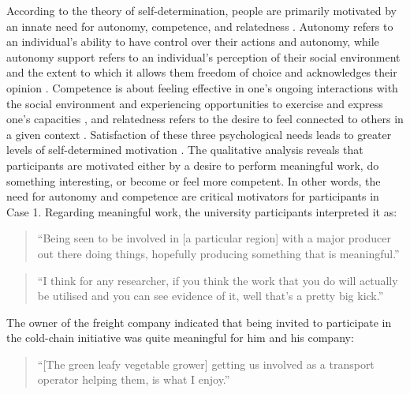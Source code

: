 According to the theory of self-determination, people are primarily motivated by an innate need for autonomy, competence, and relatedness \citep{deci1989self}. Autonomy refers to an individual's ability to have control over their actions and autonomy, while autonomy support refers to an individual's perception of their social environment and the extent to which it allows them freedom of choice and acknowledges their opinion \citep{sweet2012testing}. Competence is about feeling effective in one's ongoing interactions with the social environment and experiencing opportunities to exercise and express one's capacities \citep{vansteenkiste2020basic}, and relatedness refers to the desire to feel connected to others in a given context \citep{deci2001need}. Satisfaction of these three psychological needs leads to greater levels of self-determined motivation \citep{sweet2012testing}. The qualitative analysis reveals that participants are motivated either by a desire to perform meaningful work, do something interesting, or become or feel more competent. In other words, the need for autonomy and competence are critical motivators for participants in Case 1. Regarding meaningful work, the university participants interpreted it as:

\begin{quote}
\small
\enquote{Being seen to be involved in [a particular region] with a major producer out there doing things, hopefully producing something that is meaningful.} \\
\end{quote}

\begin{quote}
\small
\enquote{I think for any researcher, if you think the work that you do will actually be utilised and you can see evidence of it, well that’s a pretty big kick.} \\
\end{quote}

The owner of the freight company indicated that being invited to participate in the cold-chain initiative was quite meaningful for him and his company:

\begin{quote}
\small
\enquote{[The green leafy vegetable grower] getting us involved as a transport operator helping them, is what I enjoy.} \\
\end{quote}

